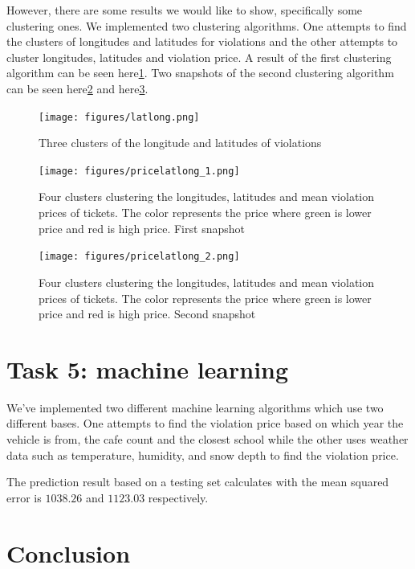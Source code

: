 \documentclass[12pt]{fphw}
\begin{document}
However, there are some results we would like to show, specifically some clustering ones. We implemented two clustering algorithms. One attempts to find the clusters of longitudes and latitudes for violations and the other attempts to cluster longitudes, latitudes and violation price. A result of the first clustering algorithm can be seen here\ref{fig:cluster_1}. Two snapshots of the second clustering algorithm can be seen here\ref{fig:cluster_2} and here\ref{fig:cluster_3}.

\begin{figure}[h!]
  \label{fig:cluster_1}
  \texttt{[image: figures/latlong.png]}
  \caption{Three clusters of the longitude and latitudes of violations}
\end{figure}

\begin{figure}[h!]
  \label{fig:cluster_2}
  \texttt{[image: figures/pricelatlong\_1.png]}
  \caption{Four clusters clustering the longitudes, latitudes and mean violation prices of tickets. The color represents the price where green is lower price and red is high price. First snapshot}
\end{figure}

\begin{figure}[h!]
  \label{fig:cluster_3}
  \texttt{[image: figures/pricelatlong\_2.png]}
  \caption{Four clusters clustering the longitudes, latitudes and mean violation prices of tickets. The color represents the price where green is lower price and red is high price. Second snapshot}
\end{figure}


\section{Task 5: machine learning}

We've implemented two different machine learning algorithms which use two different bases. One attempts to find the violation price based on which year the vehicle is from, the cafe count and the closest school while the other uses weather data such as temperature, humidity, and snow depth to find the violation price.

The prediction result based on a testing set calculates with the mean squared error is $1038.26$ and $1123.03$ respectively.

\section{Conclusion}
\end{document}
